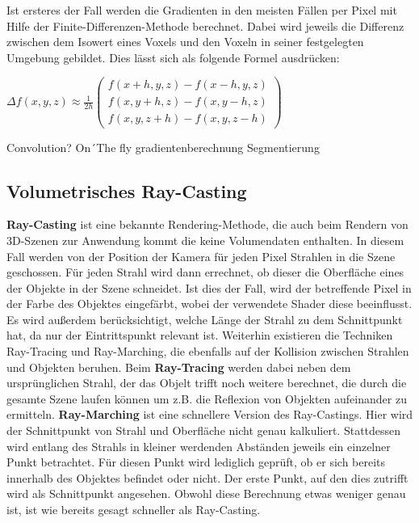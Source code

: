 Ist ersteres der Fall werden die Gradienten in den meisten Fällen per Pixel mit Hilfe der Finite-Differenzen-Methode berechnet. 
Dabei wird jeweils die Differenz zwischen dem Isowert eines Voxels und den Voxeln in seiner festgelegten Umgebung gebildet. Dies lässt sich als folgende Formel ausdrücken: 

$
\Delta f(x,y,z)\approx \frac{1}{2h}
\left ( \begin{matrix}
f(x + h, y, z) - f(x - h, y, z)\\ 
f(x, y + h, z) - f(x, y - h, z)\\ 
f(x, y, z + h) - f(x, y, z - h)
\end{matrix} \right )
$

Convolution?
On´The fly gradientenberechnung
Segmentierung

\subsection{Volumetrisches Ray-Casting}
\label{rayCasting}

\textbf{Ray-Casting} ist eine bekannte Rendering-Methode, die auch beim Rendern von 3D-Szenen zur Anwendung kommt die keine Volumendaten enthalten.
In diesem Fall werden von der Position der Kamera für jeden Pixel Strahlen in die Szene geschossen. Für jeden Strahl wird dann errechnet, ob dieser die Oberfläche eines der Objekte in der Szene schneidet. Ist dies der Fall, wird der betreffende Pixel in der Farbe des Objektes eingefärbt, wobei der verwendete Shader diese beeinflusst. Es wird außerdem berücksichtigt, welche Länge der Strahl zu dem Schnittpunkt hat, da nur der Eintrittspunkt relevant ist.
Weiterhin existieren die Techniken Ray-Tracing und Ray-Marching, die ebenfalls auf der Kollision zwischen Strahlen und Objekten beruhen.
Beim \textbf{Ray-Tracing} werden dabei neben dem ursprünglichen Strahl, der das Objelt trifft noch weitere berechnet, die durch die gesamte Szene laufen können um z.B. die Reflexion von Objekten aufeinander zu ermitteln. 
\textbf{Ray-Marching} ist eine schnellere Version des Ray-Castings. Hier wird der Schnittpunkt von Strahl und Oberfläche nicht genau kalkuliert. Stattdessen wird entlang des Strahls in kleiner werdenden Abständen jeweils ein einzelner Punkt betrachtet. Für diesen Punkt wird lediglich geprüft, ob er sich bereits innerhalb des Objektes befindet oder nicht. Der erste Punkt, auf den dies zutrifft wird als Schnittpunkt angesehen. Obwohl diese Berechnung etwas weniger genau ist, ist wie bereits gesagt schneller als Ray-Casting.

